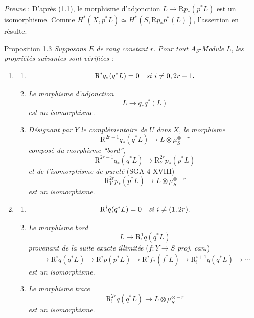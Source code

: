 \emph{Preuve} : D'après (1.1), le morphisme d'adjonction $L\to \mathrm{R} p_*(p^*L)$ est un isomorphisme. Comme $H^*(X,p^*L)\simeq H^*(S,\mathrm{R} p_*p^*(L))$, l'assertion en résulte.

\begin{statement}{Proposition 1.3}
\emph{Supposons} $E$ \emph{de rang constant} $r$. \emph{Pour tout} $A_S$-\emph{Module} $L$, \emph{les propriétés suivantes sont vérifiées} :
\begin{enumerate}[label=(\roman*)]
\item
\begin{enumerate}[label=\alph*)]
\item
\[
\mathrm{R}^i q_*(q^*L)=0\quad\text{\emph{si} }i\ne 0,2r-1.
\]
\item \emph{Le morphisme d'adjonction}
\[
L\longrightarrow q_*q^*(L)
\]
\emph{est un isomorphisme}.
\item \emph{Désignant par} $Y$ \emph{le complémentaire de} $U$
\emph{dans} $X$, \emph{le morphisme}
\[
\mathrm{R}^{2r-1}q_*(q^*L)\longrightarrow L\otimes\mu_S^{\otimes -r}
\]
\emph{composé du morphisme ``bord''},
\[
\mathrm{R}^{2r-1}q_*(q^*L)\longrightarrow \mathrm{R}_Y^{2r}p_*(p^*L)
\tag{1}
\]
\emph{et de l'isomorphisme de pureté} (SGA 4 XVIII)
\[
\mathrm{R}_Y^{2r}p_*(p^*L)\longrightarrow L\otimes\mu_S^{\otimes -r}
\]
\emph{est un isomorphisme}.
\end{enumerate}
\item
\begin{enumerate}[label=\alph*)]
\item
\[
\mathrm{R}_!^i q(q^*L)=0\quad\text{\emph{si} }i\ne (1,2r).
\]
\item \emph{Le morphisme bord}
\[
L\longrightarrow \mathrm{R}_!^1 q(q^*L)
\]
\emph{provenant de la suite exacte illimitée} ($f:Y\to S$ \emph{proj. can}.)
\[
\longrightarrow \mathrm{R}_!^i q(q^*L)\longrightarrow \mathrm{R}_!^i p(p^*L)
\longrightarrow \mathrm{R}^i f_*(f^*L)\longrightarrow \mathrm{R}_!^{i+1}q(q^*L)\longrightarrow\cdots
\]
\emph{est un isomorphisme}.
\item \emph{Le morphisme trace}
\[
\mathrm{R}_!^{2r}q(q^*L)\longrightarrow L\otimes\mu_S^{\otimes -r}
\]
\emph{est un isomorphisme}.
\end{enumerate}
\end{enumerate}
\end{statement}

